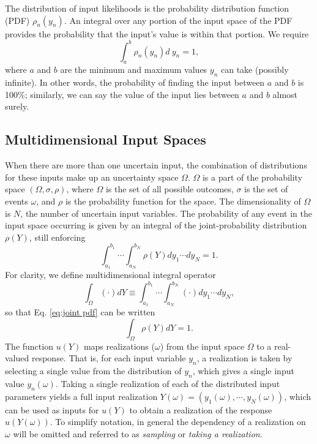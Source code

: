 The distribution of input likelihoods is the probability distribution function (PDF) $\rho_n(y_n)$.  
An integral over any portion of the input space of the PDF provides the probability that the input's value
is within that portion.
We require
\begin{equation}
  \int_a^b \rho_n(y_n) d\ y_n = 1,
\end{equation}
where $a$ and $b$ are the minimum and maximum values $y_n$ can take (possibly infinite).  In other words, the
probability of finding the input between $a$ and $b$ is 100\%; similarly, we can say the value of the input
lies between $a$ and $b$ almost surely.

\subsection{Multidimensional Input Spaces}
When there are more than one uncertain input, the combination of distributions for these inputs make up an
uncertainty space $\Omega$. $\Omega$ is a part of the probability space $(\Omega,\sigma,\rho)$, where $\Omega$
is the set of all possible outcomes, $\sigma$ is the set of events $\omega$, and $\rho$ is the probability function for
the space.  The dimensionality of $\Omega$ is $N$,
the number of uncertain input variables.  The probability of any event in the input space occurring is given
by an integral of the joint-probability distribution $\rho(Y)$, still enforcing
\begin{equation} \label{eq:joint pdf}
  \int_{a_1}^{b_1}\cdots\int_{a_N}^{b_N} \rho(Y) dy_1\cdots dy_N = 1.
\end{equation}
For clarity, we define multidimensional integral operator
\begin{equation}\label{eq: no rho}
  \int_\Omega (\cdot)dY\equiv \int_{a_1}^{b_1}\cdots\int_{a_N}^{b_N} (\cdot) dy_1\cdots dy_N,
\end{equation}
so that Eq. \ref{eq:joint pdf} can be written
\begin{equation}
  \int_\Omega \rho(Y) dY = 1.
\end{equation}
The function $u(Y)$ maps realizations ($\omega$) from the input space $\Omega$ to a real-valued response.
That is, for each input variable $y_n$, a realization is taken by selecting a single value from the
distribution of $y_n$, which gives a single input value $y_n(\omega)$.  Taking a single realization of each of
the distributed input parameters yields a full input realization $Y(\omega)=(y_1(\omega),\cdots,y_N(\omega))$,
which can be used as inputs for
$u(Y)$ to obtain a realization of the response $u(Y(\omega))$.  To simplify notation, in general the
dependency of a realization on $\omega$ will be omitted and referred to as \emph{sampling} or \emph{taking a
realization}.

